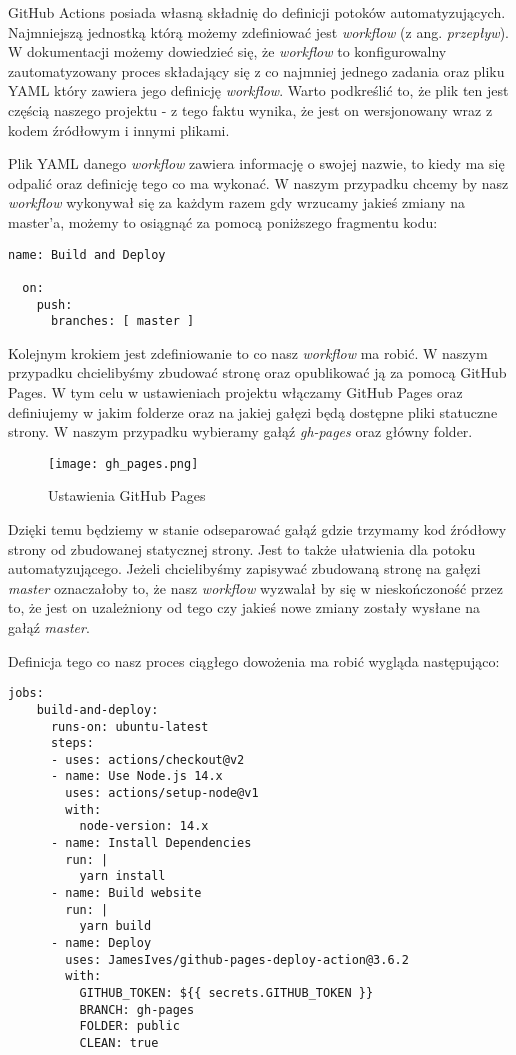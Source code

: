 \par
GitHub Actions posiada własną składnię do definicji potoków automatyzujących. Najmniejszą jednostką którą możemy zdefiniować jest \textit{workflow} (z ang. \textit{przepływ}). W dokumentacji \cite{GithubActionsDoc} możemy dowiedzieć się, że \textit{workflow} to konfigurowalny zautomatyzowany proces składający się z co najmniej jednego zadania oraz pliku YAML który zawiera jego definicję \textit{workflow}. Warto podkreślić to, że plik ten jest częścią naszego projektu - z tego faktu wynika, że jest on wersjonowany wraz z kodem źródłowym i innymi plikami.
\par
Plik YAML danego \textit{workflow} zawiera informację o swojej nazwie, to kiedy ma się odpalić oraz definicję tego co ma wykonać. W naszym przypadku chcemy by nasz \textit{workflow} wykonywał się za każdym razem gdy wrzucamy jakieś zmiany na master'a, możemy to osiągnąć za pomocą poniższego fragmentu kodu:
\begin{lstlisting}[caption={Nazwa oraz definicja wyzwalacza \textit{workflow} budującęgo stronę}]
  name: Build and Deploy

  on:
    push:
      branches: [ master ]
\end{lstlisting}
\par
Kolejnym krokiem jest zdefiniowanie to co nasz \textit{workflow} ma robić. W naszym przypadku chcielibyśmy zbudować stronę oraz opublikować ją za pomocą GitHub Pages. W tym celu w ustawieniach projektu włączamy GitHub Pages oraz definiujemy w jakim folderze oraz na jakiej gałęzi będą dostępne pliki statuczne strony. W naszym przypadku wybieramy gałąź \textit{gh-pages} oraz główny folder.
\begin{figure}[htbp]
  \centering
  \texttt{[image: gh\_pages.png]}
  \caption{Ustawienia GitHub Pages}
  \label{fig:gh_pages}
\end{figure}
Dzięki temu będziemy w stanie odseparować gałąź gdzie trzymamy kod źródłowy strony od zbudowanej statycznej strony. Jest to także ułatwienia dla potoku automatyzującego. Jeżeli chcielibyśmy zapisywać zbudowaną stronę na gałęzi \textit{master} oznaczałoby to, że nasz \textit{workflow} wyzwalał by się w nieskończoność przez to, że jest on uzależniony od tego czy jakieś nowe zmiany zostały wysłane na gałąź \textit{master}.
\par
Definicja tego co nasz proces ciągłego dowożenia ma robić wygląda następująco:
\begin{lstlisting}[caption={Definicja zadań \textit{workflow}'a budującego stronę}]
  jobs:
    build-and-deploy:
      runs-on: ubuntu-latest
      steps:
      - uses: actions/checkout@v2
      - name: Use Node.js 14.x
        uses: actions/setup-node@v1
        with:
          node-version: 14.x
      - name: Install Dependencies
        run: |
          yarn install
      - name: Build website
        run: |
          yarn build
      - name: Deploy
        uses: JamesIves/github-pages-deploy-action@3.6.2
        with:
          GITHUB_TOKEN: ${{ secrets.GITHUB_TOKEN }}
          BRANCH: gh-pages
          FOLDER: public
          CLEAN: true
\end{lstlisting}
